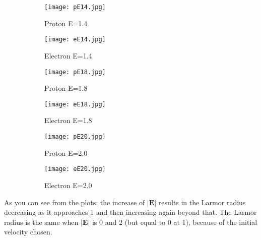 \documentclass[14paper,11pt,hidelinks]{article}
\begin{document}
\begin{figure}[h!]
\centering
\begin{subfigure}[b]{0.3\linewidth}
\texttt{[image: pE14.jpg]} 
\caption*{Proton E=1.4}
\end{subfigure}
\begin{subfigure}[b]{0.3\linewidth}
\texttt{[image: eE14.jpg]}
\caption*{Electron E=1.4}
\end{subfigure}
\caption{}
\end{figure}
\begin{figure}[h!]
\centering
\begin{subfigure}[b]{0.3\linewidth}
\texttt{[image: pE18.jpg]} 
\caption*{Proton E=1.8}
\end{subfigure}
\begin{subfigure}[b]{0.3\linewidth}
\texttt{[image: eE18.jpg]}
\caption*{Electron E=1.8}
\end{subfigure}
\caption{}
\end{figure}
\begin{figure}[h!]
\centering
\begin{subfigure}[b]{0.3\linewidth}
\texttt{[image: pE20.jpg]} 
\caption*{Proton E=2.0}
\end{subfigure}
\begin{subfigure}[b]{0.3\linewidth}
\texttt{[image: eE20.jpg]}
\caption*{Electron E=2.0}
\end{subfigure}
\caption{}
\end{figure}
\FloatBarrier
\noindent
As you can see from the plots, the increase of \begin{math} |\mathbf{E}| \end{math} results in the Larmor radius decreasing as it approaches 1 and then increasing again beyond that. The Larmor radius is the same when \begin{math} |\mathbf{E}| \end{math} is 0 and 2 (but equal to 0 at 1), because of the initial velocity chosen.


\end{document}
